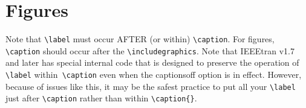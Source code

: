 \section{Figures}
Note that \verb|\label| must occur AFTER (or within) \verb|\caption|. For figures, \verb|\caption| should occur after the \verb|\includegraphics|. Note that IEEEtran v1.7 and later has special internal code that is designed to preserve the operation of \verb|\label| within\verb| \caption| even when the captionsoff option is in effect. However, because
of issues like this, it may be the safest practice to put all your \verb|\label| just after \verb|\caption| rather than within \verb|\caption{}|.